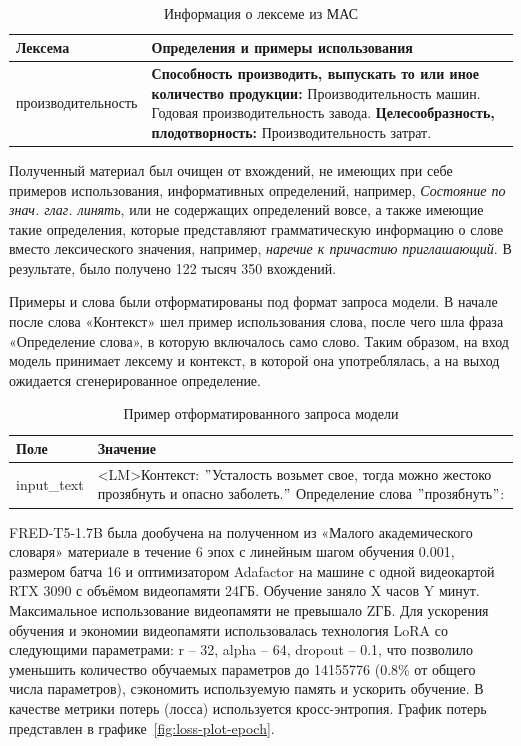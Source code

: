 \documentclass[LI,VKR]{HSEUniversity}
\begin{document}
\begin{table}[H]
\centering
\caption{Информация о лексеме из МАС} \\
\label{tab:Пример МАС}
\begin{tabular}{|m{4cm}|m{9.5cm}|}
\hline
\textbf{Лексема} & \textbf{Определения и примеры использования} \\
\hline
производительность & \textbf{Способность производить, выпускать то или иное количество продукции:} Производительность машин. Годовая производительность завода.
\newline \textbf{Целесообразность, плодотворность:} Производительность затрат. \\
\hline
\end{tabular}
\end{table}

Полученный материал был очищен от вхождений, не имеющих при себе примеров использования,
информативных определений, например, \textit{Состояние по знач. глаг. линять},
или не содержащих определений вовсе, а также имеющие такие определения,
которые представляют грамматическую информацию о слове вместо лексического значения,
например, \textit{наречие к причастию приглашающий}.
В результате, было получено 122 тысяч 350 вхождений.

Примеры и слова были отформатированы под формат запроса модели.
В начале после слова «Контекст» шел пример использования слова, после чего шла фраза
«Определение слова», в которую включалось само слово.
Таким образом, на вход модель
принимает лексему и контекст, в которой она употреблялась, а на выход ожидается сгенерированное
определение.

\begin{table}[H]
\centering
\caption{Пример отформатированного запроса модели}
\begin{tabular}{|m{2.5cm}|m{9.5cm}|}
\hline
\textbf{Поле}       & \textbf{Значение}                                                                                          \\
\hline
input\_text  & <LM>Контекст: \("\)Усталость возьмет свое, тогда можно жестоко прозябнуть и опасно заболеть.\("\) Определение слова \("\)прозябнуть\("\): \\
\hline
\end{tabular}
\end{table}

FRED-T5-1.7B была дообучена на полученном из «Малого академического словаря» материале
в течение 6 эпох с линейным шагом обучения 0.001,
размером батча 16 и оптимизатором Adafactor на машине с одной видеокартой RTX 3090
с объёмом видеопамяти 24ГБ.
Обучение заняло X часов Y минут. %
Максимальное использование видеопамяти не превышало ZГБ. %
Для ускорения обучения и экономии видеопамяти использовалась технология LoRA со
следующими параметрами: r – 32, alpha
 – 64, dropout – 0.1, что позволило
уменьшить количество обучаемых параметров до 14155776 (0.8\% от общего числа параметров),
сэкономить используемую память и ускорить обучение.
В качестве метрики потерь (лосса) используется кросс-энтропия.
График потерь представлен в графике~\ref{fig:loss-plot-epoch}.
\end{document}
